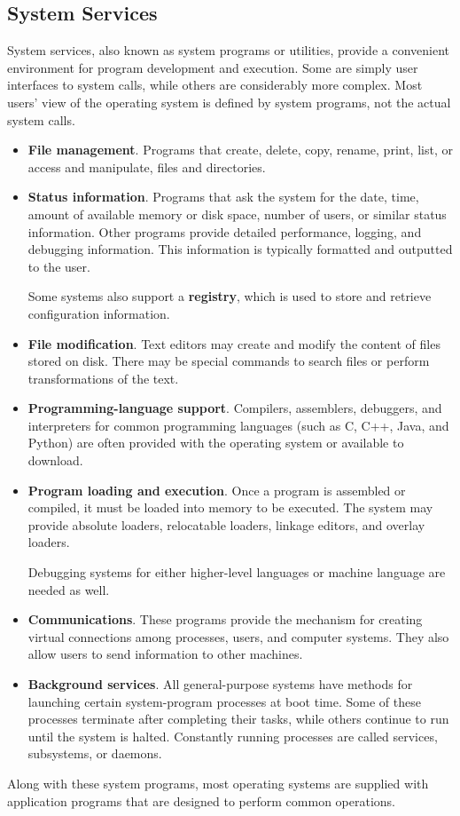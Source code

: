 \documentclass{article}
\begin{document}
\subsection{System Services}
System services, also known as system programs or utilities, provide a convenient environment for program development and execution.
Some are simply user interfaces to system calls, while others are considerably more complex.
Most users' view of the operating system is defined by system programs, not the actual system calls.
\begin{itemize}
    \item \textbf{File management}. Programs that create, delete, copy, rename, print, list, or access and manipulate, files and directories.
    \item \textbf{Status information}. Programs that ask the system for the date,
          time, amount of available memory or disk space, number of users, or
          similar status information. Other programs provide detailed
          performance, logging, and debugging information.
          This information is typically formatted and outputted to the user.

          Some systems also support a \textbf{registry},
          which is used to store and retrieve configuration information.
    \item \textbf{File modification}. Text editors may create and modify
          the content of files stored on disk. There may
          be special commands to search files or perform transformations
          of the text.
    \item \textbf{Programming-language support}. Compilers, assemblers, debuggers, and
          interpreters for common programming languages (such as C, C++, Java,
          and Python) are often provided with the operating system or available to
          download.
    \item \textbf{Program loading and execution}. Once a program is assembled or compiled,
          it must be loaded into memory to be executed. The system may
          provide absolute loaders, relocatable loaders, linkage editors, and overlay
          loaders.

          Debugging systems for either higher-level languages or machine
          language are needed as well.
    \item \textbf{Communications}. These programs provide the mechanism for creating
          virtual connections among processes, users, and computer systems. They
          also allow users to send information to other machines.
    \item \textbf{Background services}. All general-purpose systems have methods for
          launching certain system-program processes at boot time. Some of these
          processes terminate after completing their tasks, while others continue to
          run until the system is halted. Constantly running processes are called
          services, subsystems, or daemons.
\end{itemize}
Along with these system programs, most operating systems are supplied with
application programs that are designed to perform common operations.
\end{document}
